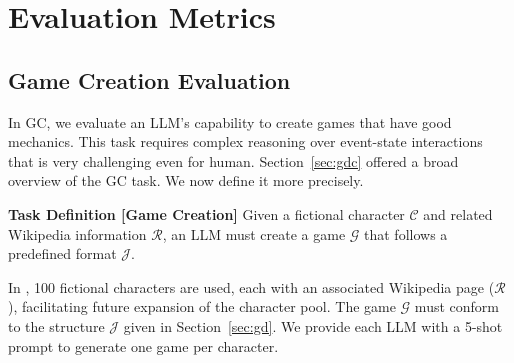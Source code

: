 
\section{Evaluation Metrics}\label{sec:evaluation}

\subsection{Game Creation Evaluation}\label{sec:evaluation_gc}

In GC, we evaluate an LLM's capability to create games that have good mechanics. This task requires complex reasoning over event-state interactions that is very challenging even for human. Section~\ref{sec:gdc} offered a broad overview of the GC task. We now define it more precisely.

\noindent\textbf{Task Definition [Game Creation]}  
Given a fictional character \(\mathcal{C}\) and related Wikipedia information \(\mathcal{R}\), an LLM must create a game \(\mathcal{G}\) that follows a predefined format \(\mathcal{J}\).

In \benchmark{}, 100 fictional characters are used, each with an associated Wikipedia page (\(\mathcal{R}\)), facilitating future expansion of the character pool. The game \(\mathcal{G}\) must conform to the structure \(\mathcal{J}\) given in Section~\ref{sec:gd}. We provide each LLM with a 5-shot prompt to generate one game per character. 

